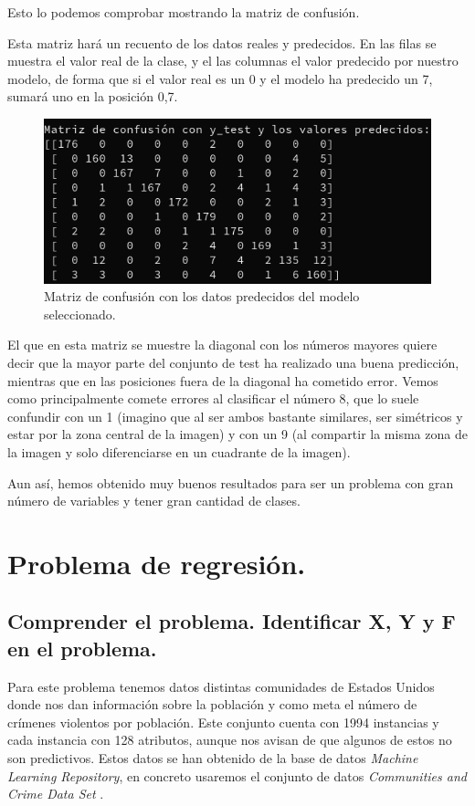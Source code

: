 \documentclass[12pt, spanish]{article}
\begin{document}
Esto lo podemos comprobar mostrando la matriz de confusión.

Esta matriz hará un recuento de los datos reales y predecidos. En las filas se muestra el valor real de la clase, y el las columnas el valor predecido por nuestro modelo, de forma que si el valor real es un 0 y el modelo ha predecido un 7, sumará uno en la posición 0,7. 

\begin{figure}[H]
	\centering
	\includegraphics[scale=0.45]{clasificacion/matrizC.png}
	\caption{Matriz de confusión con los datos predecidos del modelo seleccionado.}
	\label{MC}
\end{figure}

El que en esta matriz se muestre la diagonal con los números mayores quiere decir que la mayor parte del conjunto de test ha realizado una buena predicción, mientras que en las posiciones  fuera de la diagonal ha cometido error. Vemos como principalmente comete errores al clasificar el número 8, que lo suele confundir con un 1 (imagino que al ser ambos bastante similares, ser simétricos y estar por la zona central de la imagen) y con un 9 (al compartir la misma zona de la imagen y solo diferenciarse en un cuadrante de la imagen).

Aun así, hemos obtenido muy buenos resultados para ser un problema con gran número de variables y tener gran cantidad de clases.

\newpage

\section{Problema de regresión.}
\subsection{Comprender el problema. Identificar X, Y y F en el problema.}

Para este problema tenemos datos distintas comunidades de Estados Unidos donde nos dan información sobre la población y como meta el número de crímenes violentos por población. Este conjunto cuenta con 1994 instancias y cada instancia con 128 atributos, aunque nos avisan de que algunos de estos no son predictivos. Estos datos se han obtenido de la base de datos \textit{Machine Learning Repository}, en concreto usaremos el conjunto de datos \textit{Communities and Crime Data Set} \cite{mlr_crimen}.
\end{document}
